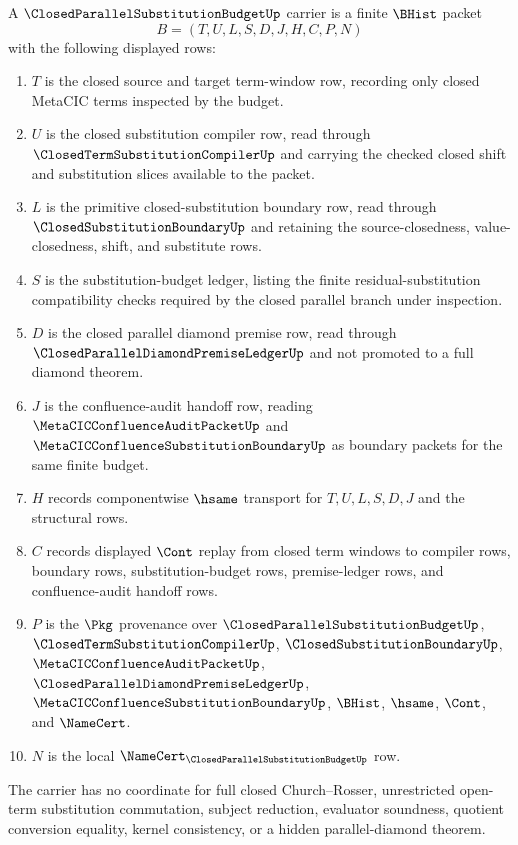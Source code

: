 \begin{definition}
\label{def:closed-parallel-substitution-budget-carrier}
A $\ClosedParallelSubstitutionBudgetUp$ carrier is a finite $\BHist$ packet
$$
B=(T,U,L,S,D,J,H,C,P,N)
$$
with the following displayed rows:
\begin{enumerate}
\item $T$ is the closed source and target term-window row, recording only closed MetaCIC terms inspected by the budget.
\item $U$ is the closed substitution compiler row, read through $\ClosedTermSubstitutionCompilerUp$ and carrying the checked closed shift and substitution slices available to the packet.
\item $L$ is the primitive closed-substitution boundary row, read through $\ClosedSubstitutionBoundaryUp$ and retaining the source-closedness, value-closedness, shift, and substitute rows.
\item $S$ is the substitution-budget ledger, listing the finite residual-substitution compatibility checks required by the closed parallel branch under inspection.
\item $D$ is the closed parallel diamond premise row, read through $\ClosedParallelDiamondPremiseLedgerUp$ and not promoted to a full diamond theorem.
\item $J$ is the confluence-audit handoff row, reading $\MetaCICConfluenceAuditPacketUp$ and $\MetaCICConfluenceSubstitutionBoundaryUp$ as boundary packets for the same finite budget.
\item $H$ records componentwise $\hsame$ transport for $T,U,L,S,D,J$ and the structural rows.
\item $C$ records displayed $\Cont$ replay from closed term windows to compiler rows, boundary rows, substitution-budget rows, premise-ledger rows, and confluence-audit handoff rows.
\item $P$ is the $\Pkg$ provenance over $\ClosedParallelSubstitutionBudgetUp$, $\ClosedTermSubstitutionCompilerUp$, $\ClosedSubstitutionBoundaryUp$, $\MetaCICConfluenceAuditPacketUp$, $\ClosedParallelDiamondPremiseLedgerUp$, $\MetaCICConfluenceSubstitutionBoundaryUp$, $\BHist$, $\hsame$, $\Cont$, and $\NameCert$.
\item $N$ is the local $\NameCert_{\ClosedParallelSubstitutionBudgetUp}$ row.
\end{enumerate}
The carrier has no coordinate for full closed Church--Rosser, unrestricted open-term substitution commutation, subject reduction, evaluator soundness, quotient conversion equality, kernel consistency, or a hidden parallel-diamond theorem.
\end{definition}

